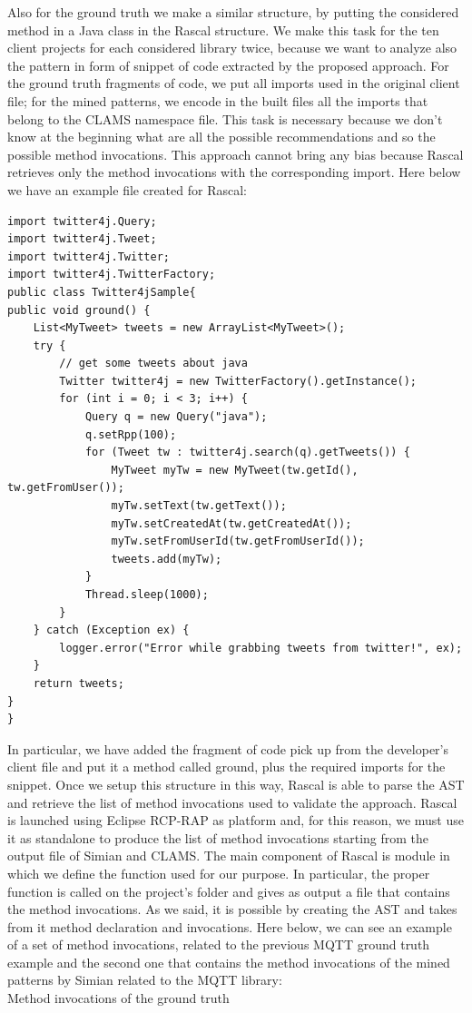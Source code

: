 Also for the ground truth we make a similar structure, by putting the considered method in a Java class in the Rascal structure. We make this task for the ten client projects for each considered library twice, because we want to analyze also the pattern in form of snippet of code extracted by the proposed approach. For the ground truth fragments of code, we put all imports used in the original client file; for the mined patterns, we encode in the built files all the imports that belong to the CLAMS namespace file. This task is necessary because we don't know at the beginning what are all the possible recommendations and so the possible method invocations. This approach cannot bring any bias because Rascal retrieves only the method invocations with the corresponding import. Here below we have an example file created for Rascal:

\begin{lstlisting}
import twitter4j.Query;
import twitter4j.Tweet;
import twitter4j.Twitter;
import twitter4j.TwitterFactory;
public class Twitter4jSample{
public void ground() {
    List<MyTweet> tweets = new ArrayList<MyTweet>();
    try {
        // get some tweets about java
        Twitter twitter4j = new TwitterFactory().getInstance();
        for (int i = 0; i < 3; i++) {
            Query q = new Query("java");
            q.setRpp(100);
            for (Tweet tw : twitter4j.search(q).getTweets()) {
                MyTweet myTw = new MyTweet(tw.getId(), tw.getFromUser());
                myTw.setText(tw.getText());
                myTw.setCreatedAt(tw.getCreatedAt());
                myTw.setFromUserId(tw.getFromUserId());
                tweets.add(myTw);
            }
            Thread.sleep(1000);
        }
    } catch (Exception ex) {
        logger.error("Error while grabbing tweets from twitter!", ex);
    }
    return tweets;
}
}
\end{lstlisting}
In particular, we have added the fragment of code pick up from the developer's client file and put it a method called ground, plus the required imports for the snippet.
Once we setup this structure in this way, Rascal is able to parse the AST and retrieve the list of method invocations used to validate the approach.
Rascal is launched using Eclipse RCP-RAP as platform and, for this reason, we must use it as standalone to produce the list of method invocations starting from the output file of Simian and CLAMS. The main component of Rascal is module in which we define the function used for our purpose. In particular, the proper function is called on the project's folder and gives as output a file that contains the method invocations. As we said, it is possible by creating the AST and takes from it method declaration and invocations. Here below, we can see an example of a set of method invocations, related to the previous MQTT ground truth example and the second one that contains the method invocations of the mined patterns by Simian related to the MQTT library:\\
Method invocations of the ground truth

